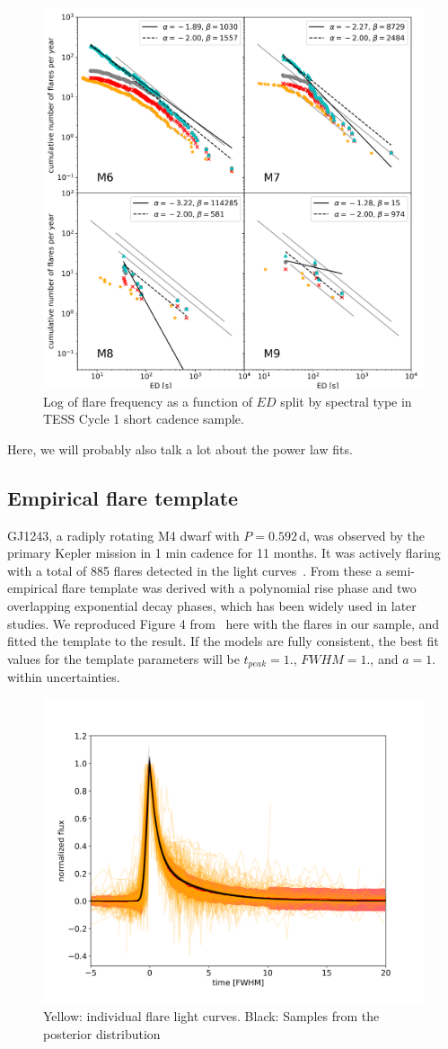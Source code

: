\documentclass{aastex62}
\begin{document}
\begin{figure}
	\includegraphics[width=.8\columnwidth]{12_03_2020_14_42_spt_ffds.png}
    \caption{Log of flare frequency as a function of $ED$ split by spectral type in TESS Cycle 1 short cadence sample.}
    \label{fig:ffd_spt_ed}
\end{figure}

Here, we will probably also talk a lot about the power law fits. 

\subsection{Empirical flare template}\label{subsec:template}
GJ1243, a radiply rotating M4 dwarf with $P=0.592$\,d, was observed by the primary Kepler mission in 1 min cadence for 11 months. It was actively flaring with a total of 885 flares detected in the light curves~\citep{davenport2014}. From these a semi-empirical flare template was derived with a polynomial rise phase and two overlapping exponential decay phases, which has been widely used in later studies. We reproduced Figure 4 from~\citet{davenport2014} here with the flares in our sample, and fitted the template to the result. If the models are fully consistent, the best fit values for the template parameters will be $t_{peak}=1.$, $FWHM=1.$, and $a=1.$ within uncertainties.

\begin{figure}
	\includegraphics[width=0.5\columnwidth]{11_03_2020_11_15_all_davenport_fit_median_norel.png}
    \caption{Yellow: individual flare light curves. Black: Samples from the posterior distribution}
    \label{fig:template}
\end{figure}
\end{document}
